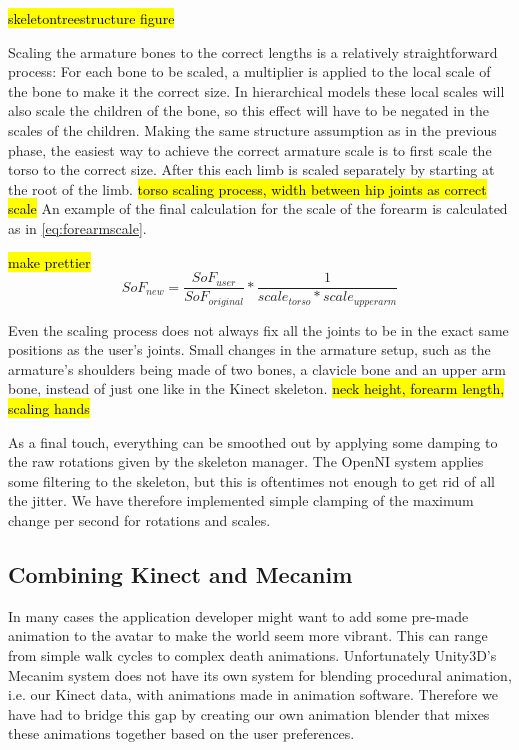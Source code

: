 \documentclass[12pt,a4paper,oneside,pdftex]{report}
\begin{document}
\hl{skeletontreestructure figure}
\begin{figure}
    \label{fig:skeletontreestructure}
\end{figure}

Scaling the armature bones to the correct lengths is a relatively straightforward process: For each bone to be scaled, a multiplier is applied to the local scale of the bone to make it the correct size. In hierarchical models these local scales will also scale the children of the bone, so this effect will have to be negated in the scales of the children. Making the same structure assumption as in the previous phase, the easiest way to achieve the correct armature scale is to first scale the torso to the correct size. After this each limb is scaled separately by starting at the root of the limb. \hl{torso scaling process, width between hip joints as correct scale} An example of the final calculation for the scale of the forearm is calculated as in \ref{eq:forearmscale}. 

\hl{make prettier}
\begin{equation}
    \label{eq:forearmscale}
    SoF_{new} = \frac{SoF_{user}}{SoF_{original}} * \frac{1}{scale_{torso} * scale_{upperarm}}
\end{equation}

Even the scaling process does not always fix all the joints to be in the exact same positions as the user's joints. Small changes in the armature setup, such as the armature's shoulders being made of two bones, a clavicle bone and an upper arm bone, instead of just one like in the Kinect skeleton. \hl{neck height, forearm length, scaling hands}

As a final touch, everything can be smoothed out by applying some damping to the raw rotations given by the skeleton manager. The OpenNI system applies some filtering to the skeleton, but this is oftentimes not enough to get rid of all the jitter. We have therefore implemented simple clamping of the maximum change per second for rotations and scales.

\subsection{Combining Kinect and Mecanim}
\label{subsection:skeletontracking:kinectandmecanim}

In many cases the application developer might want to add some pre-made animation to the avatar to make the world seem more vibrant. This can range from simple walk cycles to complex death animations. Unfortunately Unity3D's Mecanim system does not have its own system for blending procedural animation, i.e. our Kinect data, with animations made in animation software. Therefore we have had to bridge this gap by creating our own animation blender that mixes these animations together based on the user preferences. 
\end{document}
